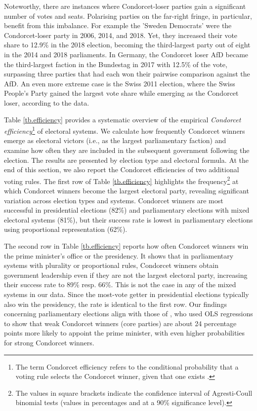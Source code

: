\documentclass[12pt]{scrartcl}
\begin{document}
Noteworthy, there are instances where Condorcet-loser parties gain a significant number of votes and seats. Polarising parties on the far-right fringe, in particular, benefit from this imbalance. For example the 'Sweden Democrats' were the Condorcet-loser party in 2006, 2014, and 2018. Yet, they increased their vote share to 12.9\% in the 2018 election, becoming the third-largest party out of eight in the 2014 and 2018 parliaments. In Germany, the Condorcet loser AfD became the third-largest faction in the Bundestag in 2017 with 12.5\% of the vote, surpassing three parties that had each won their pairwise comparison against the AfD. An even more extreme case is the Swiss 2011 election, where the Swiss People's Party gained the largest vote share while emerging as the Condorcet loser, according to the data. %

Table \ref{tb.efficiency} provides a systematic overview of the empirical \textit{Condorcet efficiency}\footnote{
    The term Condorcet efficiency refers to the conditional probability that a voting rule selects the Condorcet winner, given that one exists \citep{Gehrlein1998}.
} of electoral systems. We calculate how frequently Condorcet winners emerge as electoral victors (i.e., as the largest parliamentary faction) and examine how often they are included in the subsequent government following the election. The results are presented by election type and electoral formula. At the end of this section, we also report the Condorcet efficiencies of two additional voting rules. The first row of Table \ref{tb.efficiency} highlights the frequency\footnote{
    The values in square brackets indicate the confidence interval of Agresti-Coull binomial tests \citep{Agresti1998} (values in percentages and at a 90\% significance level).
} at which Condorcet winners become the largest electoral party, revealing significant variation across election types and systems. Condorcet winners are most successful in presidential elections (82\%) and parliamentary elections with mixed electoral systems (81\%), but their success rate is lowest in parliamentary elections using proportional representation (62\%). 
 
The second row in Table \ref{tb.efficiency} reports how often Condorcet winners win the prime minister's office or the presidency. It shows that in parliamentary systems with plurality or proportional rules, Condorcet winners obtain government leadership even if they are not the largest electoral party, increasing their success rate to 89\% resp. 66\%. This is not the case in any of the mixed systems in our data.  Since the most-vote getter in presidential elections typically also win the presidency, the rate is identical to the first row.  Our findings concerning parliamentary elections align with those of \cite{Desai2025}, who used OLS regressions to show that weak Condorcet winners (core parties) are about 24 percentage points more likely to appoint the prime minister, with even higher probabilities for strong Condorcet winners.
\end{document}
